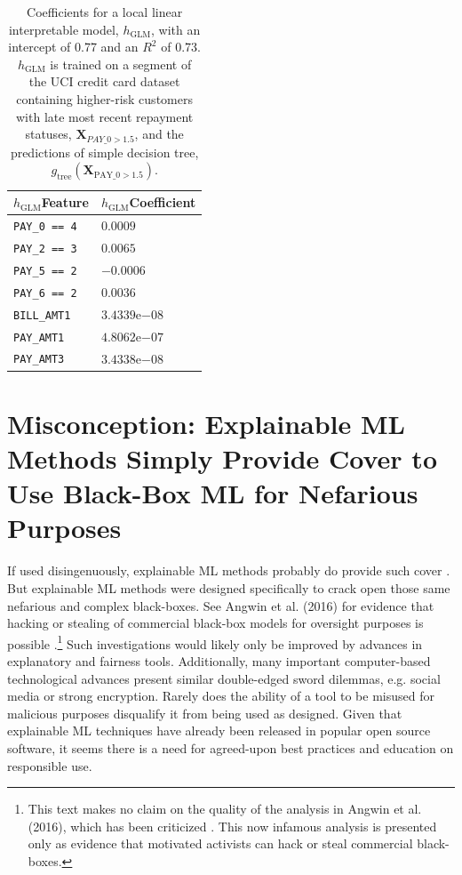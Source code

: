 \documentclass[fleqn]{article}
\begin{document}
\begin{table}[htb!]
	\caption{Coefficients for a local linear interpretable model, $h_{\text{GLM}}$, with an intercept of 0.77 and an $R^2$ of 0.73. $h_{\text{GLM}}$ is trained on a segment of the UCI credit card dataset containing higher-risk customers with late most recent repayment statuses, $\mathbf{X}_{PAY \_ 0 > 1.5}$, and the predictions of simple decision tree, $g_{\text{tree}}(\mathbf{X}_{\text{PAY\_0} > 1.5})$.}
		\centering
				\begin{tabular}{ | p{2cm} | p{1.7cm} | }
				\hline
				$h_{\text{GLM}}$\newline Feature & $h_{\text{GLM}}$\newline Coefficient \\ 
				\hline
				\texttt{PAY\_0 == 4} & $0.0009$ \\
				\hline
				\texttt{PAY\_2 == 3} & $0.0065$ \\
				\hline
				\texttt{PAY\_5 == 2} & $-0.0006$ \\
				\hline
				\texttt{PAY\_6 == 2} & $0.0036$ \\
				\hline				
				\texttt{BILL\_AMT1} & $3.4339\mathrm{e}{-08}$ \\
				\hline
				\texttt{PAY\_AMT1} & $4.8062\mathrm{e}{-07}$ \\
				\hline	
				\texttt{PAY\_AMT3} & $3.4338\mathrm{e}{-08}$ \\	
				\hline	
			\end{tabular}	
  		\label{tab:lime}
\end{table}	

\section{Misconception: Explainable ML Methods Simply Provide Cover to Use Black-Box ML for Nefarious Purposes}

If used disingenuously, explainable ML methods probably do provide such cover \cite{fair_washing}. But explainable ML methods were designed specifically to crack open those same nefarious and complex black-boxes. See Angwin et al. (2016) for evidence that hacking or stealing of commercial black-box models for oversight purposes is possible \cite{angwin16}.\footnote{This text makes no claim on the quality of the analysis in Angwin et al. (2016), which has been criticized \cite{flores2016false}. This now infamous analysis is presented only as evidence that motivated activists can hack or steal commercial black-boxes.} Such investigations would likely only be improved by advances in explanatory and fairness tools. Additionally, many important computer-based technological advances present similar double-edged sword dilemmas, e.g. social media or strong encryption. Rarely does the ability of a tool to be misused for malicious purposes disqualify it from being used as designed. Given that explainable ML techniques have already been released in popular open source software, it seems there is a need for agreed-upon best practices and education on responsible use.  
\end{document}
